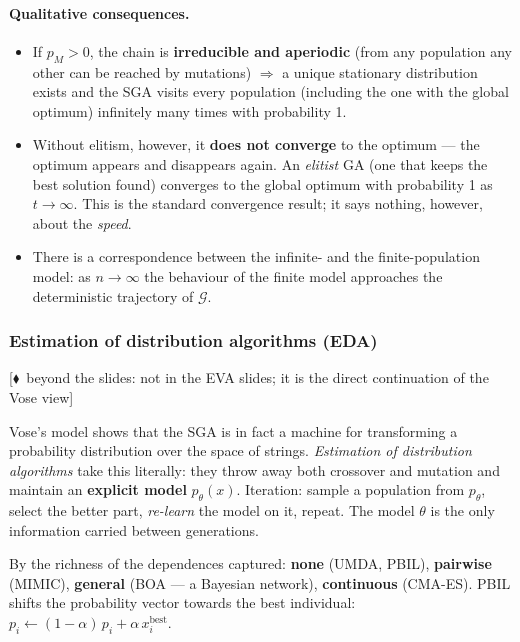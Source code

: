 \documentclass[11pt,a4paper]{article}
\theoremstyle{definition}
\newcommand{\mimoq}[1]{\textcolor{markcol}{\textsf{\footnotesize[$\blacklozenge$~beyond the slides: #1]}}}
\begin{document}
\paragraph{Qualitative consequences.}
\begin{itemize}
\item If $p_M > 0$, the chain is \textbf{irreducible and aperiodic} (from any
  population any other can be reached by mutations) $\Rightarrow$ a unique
  stationary distribution exists and the SGA visits every population (including
  the one with the global optimum) infinitely many times with probability 1.
\item Without elitism, however, it \textbf{does not converge} to the optimum ---
  the optimum appears and disappears again. An \emph{elitist} GA (one that keeps
  the best solution found) converges to the global optimum with probability 1 as
  $t \to \infty$. This is the standard convergence result; it says nothing,
  however, about the \emph{speed}.
\item There is a correspondence between the infinite- and the finite-population
  model: as $n \to \infty$ the behaviour of the finite model approaches the
  deterministic trajectory of $\mathcal{G}$.
\end{itemize}

\subsubsection{Estimation of distribution algorithms (EDA)}
\label{ssec:eda}

\noindent\mimoq{not in the EVA slides; it is the direct continuation of the Vose view}

\begin{defbox}
Vose's model shows that the SGA is in fact a machine for transforming a probability
distribution over the space of strings. \emph{Estimation of distribution algorithms} take
this literally: they throw away both crossover and mutation and maintain an
\textbf{explicit model} $p_\theta(x)$. Iteration: sample a population from $p_\theta$,
select the better part, \emph{re-learn} the model on it, repeat. The model $\theta$ is the
only information carried between generations.

By the richness of the dependences captured: \textbf{none} (UMDA, PBIL), \textbf{pairwise}
(MIMIC), \textbf{general} (BOA --- a Bayesian network), \textbf{continuous} (CMA-ES).
PBIL shifts the probability vector towards the best individual:
$p_i \gets (1-\alpha)\,p_i + \alpha\, x_i^{\mathrm{best}}$.
\end{defbox}
\end{document}
